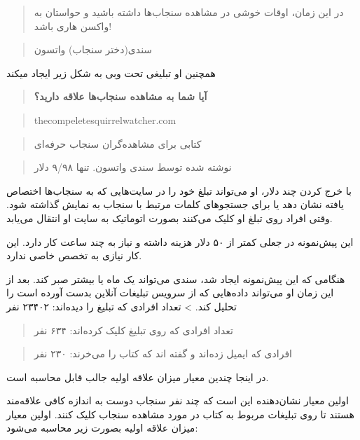\begin{quote}
در این زمان، اوقات خوشی در مشاهده سنجاب‌ها داشته باشید و حواستان به
واکسن هاری باشد!
\end{quote}

\begin{quote}
سندی(دختر سنجاب) واتسون
\end{quote}

همچنین او تبلیغی تحت وبی به شکل زیر ایجاد میکند

\begin{quote}
\textbf{آیا شما به مشاهده سنجاب‌ها علاقه دارید؟}
\end{quote}

\begin{quote}
thecompeletesquirrelwatcher.com
\end{quote}

\begin{quote}
کتابی برای مشاهده‌گران سنجاب حرفه‌ای
\end{quote}

\begin{quote}
نوشته شده توسط سندی واتسون. تنها ۹/۹۸ دلار
\end{quote}

با خرج کردن چند دلار، او می‌تواند تبلغ خود را در سایت‌هایی که به
سنجاب‌ها اختصاص یافته نشان دهد یا برای جستجوهای کلمات مرتبط با سنجاب به
نمایش گذاشته شود. وقتی افراد روی تبلغ او کلیک می‌کنند بصورت اتوماتیک به
سایت او انتقال می‌یابد.

این پیش‌نمونه در جعلی کمتر از ۵۰ دلار هزینه داشته و نیاز به چند ساعت کار
دارد. این کار نیازی به تخصص خاصی ندارد.

هنگامی که این پیش‌نمونه ایجاد شد، سندی می‌تواند یک ماه یا بیشتر صبر کند.
بعد از این زمان او می‌تواند داده‌هایی که از سرویس تبلیغات آنلاین بدست
آورده است را تحلیل کند. \textgreater{} تعداد افرادی که تبلیغ را
دیده‌اند: ۲۳۴۰۲ نفر

\begin{quote}
تعداد افرادی که روی تبلیغ کلیک کرده‌اند: ۶۳۴ نفر
\end{quote}

\begin{quote}
افرادی که ایمیل زده‌اند و گفته اند که کتاب را می‌خرند: ۲۳۰ نفر
\end{quote}

در اینجا چندین معیار میزان علاقه اولیه جالب قابل محاسبه است.

اولین معیار نشان‌دهنده این است که چند نفر سنجاب دوست به اندازه کافی
علاقه‌مند هستند تا روی تبلیغات مربوط به کتاب در مورد مشاهده سنجاب کلیک
کنند. اولین معیار میزان علاقه اولیه بصورت زیر محاسبه می‌شود:

